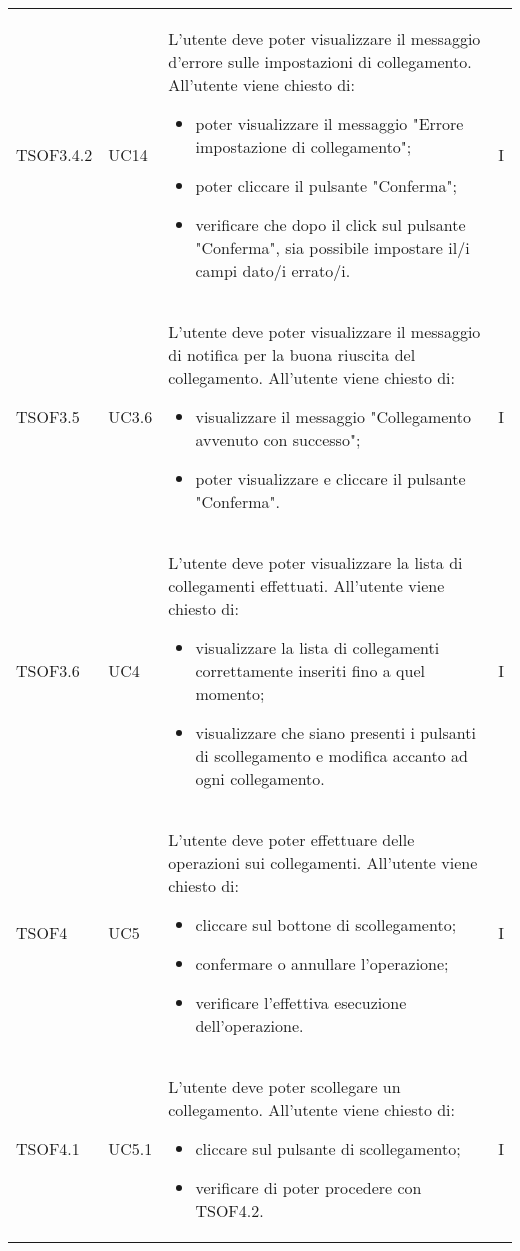 \begin{longtable}{C{2.5cm} C{2.5cm} L{8cm} C{2cm}}
TSOF3.4.2 &
UC14 &
L'utente  deve poter visualizzare il messaggio d'errore sulle impostazioni di collegamento. All'utente viene chiesto di:
\begin{itemize}
	\item poter visualizzare il messaggio "Errore impostazione di collegamento";
	\item poter cliccare il pulsante "Conferma";
	\item verificare che dopo il click sul pulsante "Conferma", sia possibile impostare il/i campi dato/i errato/i.
\end{itemize}&
I \\

TSOF3.5 &
UC3.6 &
L’utente deve poter visualizzare il messaggio di notifica per la buona riuscita del collegamento. All’utente viene chiesto di:
\begin{itemize}
	\item visualizzare il messaggio "Collegamento avvenuto con successo";
	\item poter visualizzare e cliccare il pulsante "Conferma".
\end{itemize}&
I \\

TSOF3.6 &
UC4 &
L’utente deve poter visualizzare la lista di collegamenti effettuati. All’utente viene chiesto di:
\begin{itemize}
	\item visualizzare la lista di collegamenti correttamente inseriti fino a quel momento;
	\item visualizzare che siano presenti i pulsanti di scollegamento e modifica accanto ad ogni collegamento.
\end{itemize}&
I \\


TSOF4 &
UC5 &
L'utente deve poter effettuare delle operazioni sui collegamenti. All'utente viene chiesto di:
\begin{itemize}
	\item cliccare sul bottone di scollegamento;
	\item confermare o annullare l'operazione;
	\item verificare l'effettiva esecuzione dell'operazione.
\end{itemize}&
I \\


TSOF4.1 &
UC5.1 &
L'utente deve poter scollegare un collegamento. All'utente viene chiesto di:
\begin{itemize}
	\item cliccare sul pulsante di scollegamento;
	\item verificare di poter procedere con TSOF4.2.
\end{itemize}&
I \\


\end{longtable}
